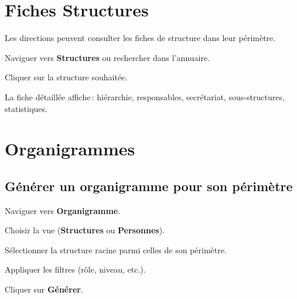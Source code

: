 \section{Fiches Structures}

Les directions peuvent consulter les fiches de structure dans leur p\'erim\`etre.

\begin{steps}
  \item Naviguer vers \textbf{Structures} ou rechercher dans l'annuaire.
  \item Cliquer sur la structure souhait\'ee.
  \item La fiche d\'etaill\'ee affiche\,: hi\'erarchie, responsables, secr\'etariat, sous-structures, statistiques.
\end{steps}


\section{Organigrammes}

\subsection{G\'en\'erer un organigramme pour son p\'erim\`etre}

\begin{steps}
  \item Naviguer vers \textbf{Organigramme}.
  \item Choisir la vue (\textbf{Structures} ou \textbf{Personnes}).
  \item S\'electionner la structure racine parmi celles de son p\'erim\`etre.
  \item Appliquer les filtres (r\^ole, niveau, etc.).
  \item Cliquer sur \textbf{G\'en\'erer}.
\end{steps}


